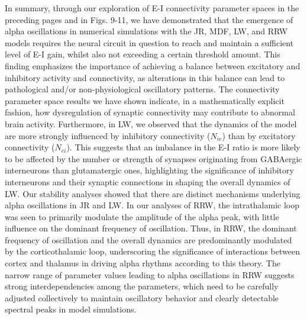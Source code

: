 \documentclass[12pt,twoside]{article}
\begin{document}
In summary, through our exploration of E-I connectivity parameter spaces in the preceding pages and in Figs. 9-11, we have demonstrated that the emergence of alpha oscillations in numerical simulations with the JR, MDF, LW, and RRW models requires the neural circuit in question to reach and maintain a sufficient level of E-I gain, whilst also not exceeding a certain threshold amount. This finding emphasizes the importance of achieving a balance between excitatory and inhibitory activity and connectivity, as alterations in this balance can lead to pathological and/or non-physiological oscillatory patterns. The connectivity parameter space results we have shown indicate, in a mathematically explicit fashion, how dysregulation of synaptic connectivity may contribute to abnormal brain activity. Furthermore, in LW, we observed that the dynamics of the model are more strongly influenced by inhibitory connectivity ($N_{ie}$) than by excitatory connectivity ($N_{ei}$). This suggests that an imbalance in the E-I ratio is more likely to be affected by the number or strength of synapses originating from GABAergic interneurons than glutamatergic ones, highlighting the significance of inhibitory interneurons and their synaptic connections in shaping the overall dynamics of LW.
Our stability analyses showed that there are distinct mechanisms underlying alpha oscillations in JR and LW. In our analyses of RRW, the intrathalamic loop was seen to primarily modulate the amplitude of the alpha peak, with little influence on the dominant frequency of oscillation. Thus, in RRW, the dominant frequency of oscillation and the overall dynamics are predominantly modulated by the corticothalamic loop, underscoring the significance of interactions between cortex and thalamus in driving alpha rhythms according to this theory. The narrow range of parameter values leading to alpha oscillations in RRW suggests strong interdependencies among the parameters, which need to be carefully adjusted collectively to maintain oscillatory behavior and clearly detectable spectral peaks in model simulations.
\end{document}

